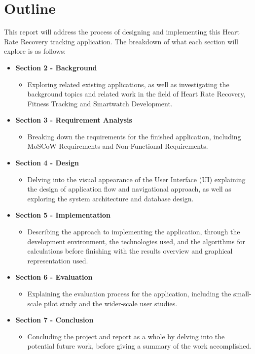 \documentclass{l4proj}
\begin{document}
\section{Outline}
\label{sec:outline}

This report will address the process of designing and implementing this Heart Rate Recovery tracking application. The breakdown of what each section will explore is as follows:

\begin{itemize}
    \item \textbf{Section 2 - Background}
    \begin{itemize}
        \item Exploring related existing applications, as well as investigating the background topics and related work in the field of Heart Rate Recovery, Fitness Tracking and Smartwatch Development.
    \end{itemize}
    \item \textbf{Section 3 - Requirement Analysis}
    \begin{itemize}
        \item Breaking down the requirements for the finished application, including MoSCoW Requirements and Non-Functional Requirements.
    \end{itemize}
    \item \textbf{Section 4 - Design}
    \begin{itemize}
        \item Delving into the visual appearance of the User Interface (UI) explaining the design of application flow and navigational approach, as well as exploring the system architecture and database design.
    \end{itemize}
    \item \textbf{Section 5 - Implementation}
    \begin{itemize}
        \item Describing the approach to implementing the application, through the development environment, the technologies used, and the algorithms for calculations before finishing with the results overview and graphical representation used.
    \end{itemize}
    \item \textbf{Section 6 - Evaluation}
    \begin{itemize}
        \item Explaining the evaluation process for the application, including the small-scale pilot study and the wider-scale user studies.
    \end{itemize}
    \item \textbf{Section 7 - Conclusion}
    \begin{itemize}
        \item Concluding the project and report as a whole by delving into the potential future work, before giving a summary of the work accomplished.
    \end{itemize}
\end{itemize}
\end{document}
